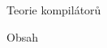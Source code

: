\nopagenumbers

\tit Teorie kompilátorů
\newpage

\nonum\notoc\sec Obsah
\maketoc
\newpage

\pagenumbers
